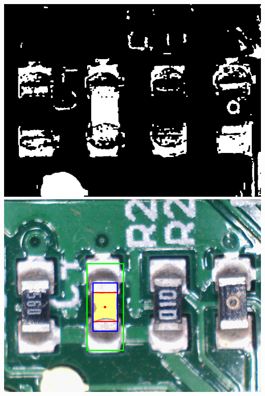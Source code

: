 \documentclass[12pt]{article}
\begin{document}
\newpage
\includegraphics[scale=0.8]{images/Segmentation/binary.png}
\newpage
\includegraphics[scale=0.8]{images/Segmentation/part_analysis.png}
\end{document}
